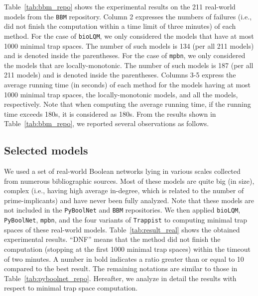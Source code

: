 \documentclass[preprint,12pt]{elsarticle}
\begin{document}
Table~\ref{tab:bbm_repo} shows the experimental results on the 211 real-world models from the \texttt{BBM} repository.
Column 2 expresses the numbers of failures (i.e., did not finish the computation within a time limit of three minutes) of each method.
For the case of \texttt{bioLQM}, we only considered the models that have at most 1000 minimal trap spaces.
The number of such models is 134 (per all 211 models) and is denoted inside the parentheses.
For the case of \texttt{mpbn}, we only considered the models that are locally-monotonic.
The number of such models is 187 (per all 211 models) and is denoted inside the parentheses.
Columns 3-5 express the average running time (in seconds) of each method for the models having at most 1000 minimal trap spaces, the locally-monotonic models, and all the models, respectively.
Note that when computing the average running time, if the running time exceeds 180s, it is considered as 180s.
From the results shown in Table~\ref{tab:bbm_repo}, we reported several observations as follows.


\subsection{Selected models}

We used a set of real-world Boolean networks lying in various scales collected from numerous bibliographic sources.
Most of these models are quite big (in size), complex (i.e., having high average in-degree, which is related to the number of prime-implicants) and have never been fully analyzed.
Note that these models are not included in the \texttt{PyBoolNet} and \texttt{BBM} repositories.
We then applied \texttt{bioLQM}, \texttt{PyBoolNet}, \texttt{mpbn}, and the four variants of \texttt{Trappist} to computing minimal trap spaces of these real-world models.
Table~\ref{tab:result_real} shows the obtained experimental results. 
``DNF'' means that the method did not finish the computation (stopping at the first 1000 minimal trap spaces) within the timeout of two minutes.
A number in bold indicates a ratio greater than or equal to 10 compared to the best result.
The remaining notations are similar to those in Table~\ref{tab:pyboolnet_repo}.
Hereafter, we analyze in detail the results with respect to minimal trap space computation.
    
\end{document}
